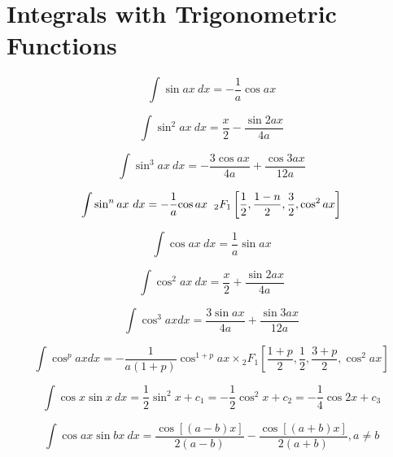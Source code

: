\documentclass[12pt,a4paper,leqno]{article}
\begin{document}
   \section* {Integrals with Trigonometric Functions}

   \begin{equation}
   \int \sin ax \ dx = -\frac{1}{a} \cos ax
   \end{equation}

   \begin{equation}
   \int \sin^2 ax\  dx = \frac{x}{2} - \frac{\sin 2ax} {4a}
   \end{equation}

   \begin{equation}
   \int \sin^3 ax \ dx = -\frac{3 \cos ax}{4a} + \frac{\cos 3ax} {12a}
   \end{equation}

   \begin{equation}
   \int \sin^n ax \ dx =
    -\frac{1}{a}{\cos ax} \hspace{2mm}{_2F_1}\left[
   \frac{1}{2}, \frac{1-n}{2}, \frac{3}{2}, \cos^2 ax
   \right]
   \end{equation}



   \begin{equation}
   \int \cos ax\ dx= \frac{1}{a} \sin ax
   \end{equation}

   \begin{equation}
   \int \cos^2 ax\ dx = \frac{x}{2}+\frac{ \sin 2ax}{4a}
   \end{equation}

   \begin{equation}
   \int \cos^3 ax dx = \frac{3 \sin ax}{4a}+\frac{ \sin 3ax}{12a}
   \end{equation}

   \begin{equation}
   \int \cos^p ax dx  = -\frac{1}{a(1+p)}{\cos^{1+p} ax} \times
   {_2F_1}\left[
   \frac{1+p}{2}, \frac{1}{2}, \frac{3+p}{2}, \cos^2 ax
   \right]
   \end{equation}

   \begin{equation}\label{eq:veky}
   \int \cos x \sin x\ dx = \frac{1}{2}\sin^2 x + c_1 = -\frac{1}{2} \cos^2x + c_2 = -\frac{1}{4} \cos 2x + c_3
   \end{equation}

   \begin{equation}
   \int \cos ax \sin bx\ dx = \frac{\cos[(a-b) x]}{2(a-b)} -
    \frac{\cos[(a+b)x]}{2(a+b)} , a\ne b
   \end{equation}
\end{document}
